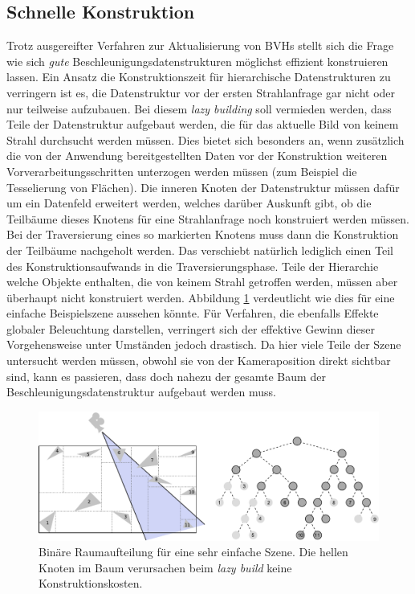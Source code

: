 \subsection{Schnelle Konstruktion}
\label{sec:lazy}
Trotz ausgereifter Verfahren zur Aktualisierung von BVHs stellt sich die Frage wie sich \textit{gute} Beschleunigungsdatenstrukturen möglichst effizient konstruieren lassen.
Ein Ansatz die Konstruktionszeit für hierarchische Datenstrukturen zu verringern ist es, die Datenstruktur vor der ersten Strahlanfrage gar nicht oder nur teilweise aufzubauen. Bei diesem \textit{lazy building} soll vermieden werden, dass Teile der Datenstruktur aufgebaut werden, die für das aktuelle Bild von keinem Strahl durchsucht werden müssen. Dies bietet sich besonders an, wenn zusätzlich die von der Anwendung bereitgestellten Daten vor der Konstruktion weiteren Vorverarbeitungsschritten unterzogen werden müssen (zum Beispiel die Tesselierung von Flächen\cite{RAZOR07}).
Die inneren Knoten der Datenstruktur müssen dafür um ein Datenfeld erweitert werden, welches darüber Auskunft gibt, ob die Teilbäume dieses Knotens für eine Strahlanfrage noch konstruiert werden müssen. Bei der Traversierung eines so markierten Knotens muss dann die Konstruktion der Teilbäume nachgeholt werden. Das verschiebt natürlich lediglich einen Teil des Konstruktionsaufwands in die Traversierungsphase. Teile der Hierarchie welche Objekte enthalten, die von keinem Strahl getroffen werden, müssen aber überhaupt nicht konstruiert werden. Abbildung \ref{fig:lazybuild} verdeutlicht wie dies für eine einfache Beispielszene aussehen könnte.
Für Verfahren, die ebenfalls Effekte globaler Beleuchtung darstellen, verringert sich der effektive Gewinn dieser Vorgehensweise unter Umständen jedoch drastisch. Da hier viele Teile der Szene untersucht werden müssen, obwohl sie von der Kameraposition direkt sichtbar sind, kann es passieren, dass doch nahezu der gesamte Baum der Beschleunigungsdatenstruktur aufgebaut werden muss.

\begin{figure}\centering
\includegraphics[width=1.0\textwidth]{images/lazybuild.pdf} 
\caption[Lazy build für binäre Raumaufteilung]{Binäre Raumaufteilung für eine sehr einfache Szene. Die hellen Knoten im Baum verursachen beim \textit{lazy build} keine Konstruktionskosten.}
\label{fig:lazybuild}
\end{figure}

